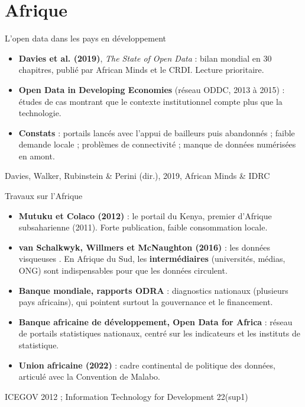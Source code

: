 \documentclass[11pt,aspectratio=169]{beamer}
\newcommand{\refc}[1]{\textcolor{gris}{\footnotesize #1}}
\begin{document}
\section{Afrique}

\begin{frame}{L'open data dans les pays en développement}
  \begin{itemize}
    \item \textbf{Davies et al. (2019)}, \emph{The State of Open Data} : bilan mondial en 30 chapitres, publié par African Minds et le CRDI. Lecture prioritaire.
    \item \textbf{Open Data in Developing Economies} (réseau ODDC, 2013 à 2015) : études de cas montrant que le contexte institutionnel compte plus que la technologie.
    \item \textbf{Constats} : portails lancés avec l'appui de bailleurs puis abandonnés ; faible demande locale ; problèmes de connectivité ; manque de données numérisées en amont.
  \end{itemize}
  \vfill
  \refc{Davies, Walker, Rubinstein \& Perini (dir.), 2019, African Minds \& IDRC}
\end{frame}

\begin{frame}{Travaux sur l'Afrique}
  \begin{itemize}
    \item \textbf{Mutuku et Colaco (2012)} : le portail du Kenya, premier d'Afrique subsaharienne (2011). Forte publication, faible consommation locale.
    \item \textbf{van Schalkwyk, Willmers et McNaughton (2016)} : les données \og visqueuses \fg{}. En Afrique du Sud, les \textbf{intermédiaires} (universités, médias, ONG) sont indispensables pour que les données circulent.
    \item \textbf{Banque mondiale, rapports ODRA} : diagnostics nationaux (plusieurs pays africains), qui pointent surtout la gouvernance et le financement.
    \item \textbf{Banque africaine de développement, Open Data for Africa} : réseau de portails statistiques nationaux, centré sur les indicateurs et les instituts de statistique.
    \item \textbf{Union africaine (2022)} : cadre continental de politique des données, articulé avec la Convention de Malabo.
  \end{itemize}
  \vfill
  \refc{ICEGOV 2012 ; Information Technology for Development 22(sup1)}
\end{frame}
\end{document}
